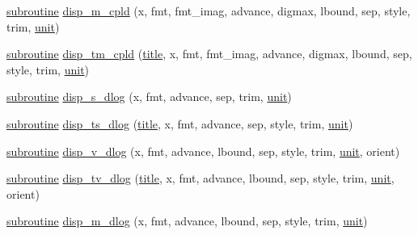 \begin{DoxyCompactItemize}
\item 
\hyperlink{M__stopwatch_83_8txt_acfbcff50169d691ff02d4a123ed70482}{subroutine} \hyperlink{interfacem__display_1_1disp_a2944f5c9f6a1390fddfbe38f59d4872d}{disp\+\_\+m\+\_\+cpld} (x, fmt, fmt\+\_\+imag, advance, digmax, lbound, sep, style, trim, \hyperlink{M__stopwatch_83_8txt_a5cbef30eb7c0d734bd82f5a7ebea9aa7}{unit})
\item 
\hyperlink{M__stopwatch_83_8txt_acfbcff50169d691ff02d4a123ed70482}{subroutine} \hyperlink{interfacem__display_1_1disp_a1361b57262e258339819de07cc724785}{disp\+\_\+tm\+\_\+cpld} (\hyperlink{print__watch_83_8txt_a15b5bd21156bb9fca6a755ab8c029a9c}{title}, x, fmt, fmt\+\_\+imag, advance, digmax, lbound, sep, style, trim, \hyperlink{M__stopwatch_83_8txt_a5cbef30eb7c0d734bd82f5a7ebea9aa7}{unit})
\item 
\hyperlink{M__stopwatch_83_8txt_acfbcff50169d691ff02d4a123ed70482}{subroutine} \hyperlink{interfacem__display_1_1disp_a2c6bdc40d7c8761796df4590fadfb192}{disp\+\_\+s\+\_\+dlog} (x, fmt, advance, sep, trim, \hyperlink{M__stopwatch_83_8txt_a5cbef30eb7c0d734bd82f5a7ebea9aa7}{unit})
\item 
\hyperlink{M__stopwatch_83_8txt_acfbcff50169d691ff02d4a123ed70482}{subroutine} \hyperlink{interfacem__display_1_1disp_afcdaefab8c1988c34f8e8b9695a1adb0}{disp\+\_\+ts\+\_\+dlog} (\hyperlink{print__watch_83_8txt_a15b5bd21156bb9fca6a755ab8c029a9c}{title}, x, fmt, advance, sep, style, trim, \hyperlink{M__stopwatch_83_8txt_a5cbef30eb7c0d734bd82f5a7ebea9aa7}{unit})
\item 
\hyperlink{M__stopwatch_83_8txt_acfbcff50169d691ff02d4a123ed70482}{subroutine} \hyperlink{interfacem__display_1_1disp_a9424131af4257736ae43d49968c70489}{disp\+\_\+v\+\_\+dlog} (x, fmt, advance, lbound, sep, style, trim, \hyperlink{M__stopwatch_83_8txt_a5cbef30eb7c0d734bd82f5a7ebea9aa7}{unit}, orient)
\item 
\hyperlink{M__stopwatch_83_8txt_acfbcff50169d691ff02d4a123ed70482}{subroutine} \hyperlink{interfacem__display_1_1disp_abed8473bf813878da4854bb252f035fb}{disp\+\_\+tv\+\_\+dlog} (\hyperlink{print__watch_83_8txt_a15b5bd21156bb9fca6a755ab8c029a9c}{title}, x, fmt, advance, lbound, sep, style, trim, \hyperlink{M__stopwatch_83_8txt_a5cbef30eb7c0d734bd82f5a7ebea9aa7}{unit}, orient)
\item 
\hyperlink{M__stopwatch_83_8txt_acfbcff50169d691ff02d4a123ed70482}{subroutine} \hyperlink{interfacem__display_1_1disp_a7cbadd11c757bb9560801680f507d9bf}{disp\+\_\+m\+\_\+dlog} (x, fmt, advance, lbound, sep, style, trim, \hyperlink{M__stopwatch_83_8txt_a5cbef30eb7c0d734bd82f5a7ebea9aa7}{unit})

\end{DoxyCompactItemize}
